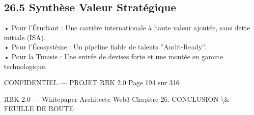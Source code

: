 \subsection{26.5 Synthèse Valeur Stratégique}
• Pour l’Étudiant : Une carrière internationale à haute valeur ajoutée, sans dette initiale (ISA).\\
\vspace{0.5em}
• Pour l’Écosystème : Un pipeline fiable de talents ”Audit-Ready”.\\
\vspace{0.5em}
• Pour la Tunisie : Une entrée de devises forte et une montée en gamme technologique.\\
\vspace{0.5em}
\vspace{0.5em}
\vspace{0.5em}
\begin{confidential}CONFIDENTIEL — PROJET RBK 2.0                                Page 194 sur 316\end{confidential}
RBK 2.0 — Whitepaper Architecte Web3                                                      Chapitre 26. CONCLUSION \textbackslash{}& FEUILLE DE ROUTE\\
\vspace{0.5em}
\vspace{0.5em}
\vspace{0.5em}
